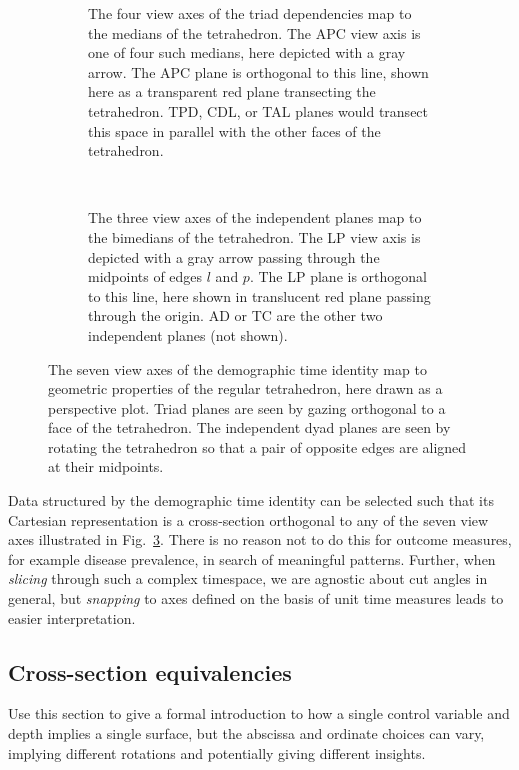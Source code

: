 \documentclass{bmcart}
\begin{document}
\begin{figure}
\begin{subfigure}[t]{0.45\linewidth}
    \centering
    \resizebox{\linewidth}{\linewidth}{
    
    }
    \caption{The four view axes of the triad dependencies map to the medians of the tetrahedron. The APC view axis is one of four such medians, here depicted with a gray arrow. The APC plane is orthogonal to this line, shown here as a transparent red plane transecting the tetrahedron. TPD, CDL, or TAL planes would transect this space in parallel with the other faces of the tetrahedron.}
    \label{fig:depviewaxes}
\end{subfigure}
~~
\begin{subfigure}[t]{0.45\linewidth}
    \resizebox{\linewidth}{\linewidth}{
     
     }
    \caption{The three view axes of the independent planes map to the bimedians of the tetrahedron. The LP view axis is depicted with a gray arrow passing through the midpoints of edges $l$ and $p$. The LP plane is orthogonal to this line, here shown in translucent red plane passing through the origin. AD or TC are the other two independent planes (not shown).}
    \label{fig:indepviewaxes}       
\end{subfigure}
\caption{The seven view axes of the demographic time identity map to geometric properties of the regular tetrahedron, here drawn as a perspective plot. Triad planes are seen by gazing orthogonal to a face of the tetrahedron. The independent dyad planes are seen by rotating the tetrahedron so that a pair of opposite edges are aligned at their midpoints. }
\label{fig:viewaxes}
\end{figure}

Data structured by the demographic time identity can be selected such that its Cartesian representation is a cross-section orthogonal to any of the seven view axes illustrated in Fig.~\ref{fig:viewaxes}. There is no reason not to do this for outcome measures, for example disease prevalence, in search of meaningful patterns. Further, when \emph{slicing} through such a complex timespace, we are agnostic about cut angles in general, but \emph{snapping} to axes defined on the basis of unit time measures leads to easier interpretation.

\subsection*{Cross-section equivalencies}
Use this section to give a formal introduction to how a single control variable and depth implies a single surface, but the abscissa and ordinate choices can vary, implying different rotations and potentially giving different insights.
\end{document}
